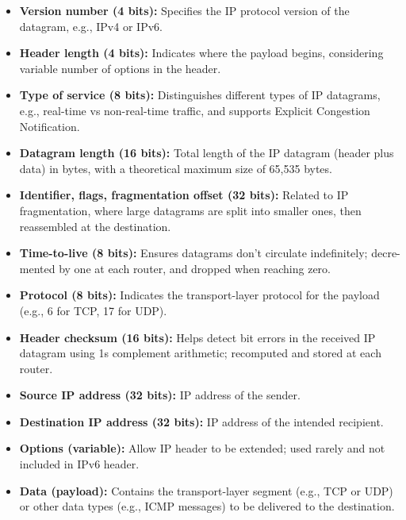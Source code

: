 \begin{itemize}
    \item \textbf{Version number (4 bits):} Specifies the IP protocol version of the datagram, e.g., IPv4 or IPv6.
    
    \item \textbf{Header length (4 bits):} Indicates where the payload begins, considering variable number of options in the header.
    
    \item \textbf{Type of service (8 bits):} Distinguishes different types of IP datagrams, e.g., real-time vs non-real-time traffic, and supports Explicit Congestion Notification.
    
    \item \textbf{Datagram length (16 bits):} Total length of the IP datagram (header plus data) in bytes, with a theoretical maximum size of 65,535 bytes.
    
    \item \textbf{Identifier, flags, fragmentation offset (32 bits):} Related to IP fragmentation, where large datagrams are split into smaller ones, then reassembled at the destination.
    
    \item \textbf{Time-to-live (8 bits):} Ensures datagrams don't circulate indefinitely; decre- mented by one at each router, and dropped when reaching zero.
    
    \item \textbf{Protocol (8 bits):} Indicates the transport-layer protocol for the payload (e.g., 6 for TCP, 17 for UDP).
    
    \item \textbf{Header checksum (16 bits):} Helps detect bit errors in the received IP datagram using 1s complement arithmetic; recomputed and stored at each router.
    
    \item \textbf{Source IP address (32 bits):} IP address of the sender.
    
    \item \textbf{Destination IP address (32 bits):} IP address of the intended recipient.
    
    \item \textbf{Options (variable):} Allow IP header to be extended; used rarely and not included in IPv6 header.
    
    \item \textbf{Data (payload):} Contains the transport-layer segment (e.g., TCP or UDP) or other data types (e.g., ICMP messages) to be delivered to the destination.
\end{itemize}

